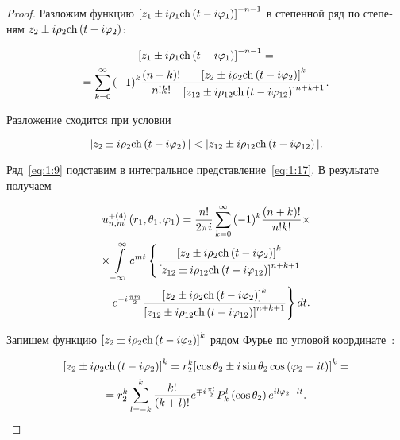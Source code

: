 \begin{russian}
\begin{proof}
Разложим функцию ${\left[ {{z_1} \pm i{\rho _1}{\mathop{\rm ch}\nolimits} \left( {t - i{\varphi _1}} \right)} \right]^{ - n - 1}}$ в степенной ряд по степеням ${z_2} \pm i{\rho _2}{\mathop{\rm ch}\nolimits} \left( {t - i{\varphi _2}} \right)$:

\begin{multline}\label{eq:1:19}
{\left[ {{z_1} \pm i{\rho _1}{\mathop{\rm ch}\nolimits} \left( {t - i{\varphi _1}} \right)} \right]^{ - n - 1}} = \\
= \sum\limits_{k = 0}^\infty  {{{( - 1)}^k}} \frac{{(n + k)!}}{{n!k!}}\frac{{{{\left[ {{z_2} \pm i{\rho _2}{\mathop{\rm ch}\nolimits} \left( {t - i{\varphi _2}} \right)} \right]}^k}}}{{{{\left[ {{z_{12}} \pm i{\rho _{12}}{\mathop{\rm ch}\nolimits} \left( {t - i{\varphi _{12}}} \right)} \right]}^{n + k + 1}}}}.
\end{multline}

Разложение сходится при условии

\[|{z_2} \pm i{\rho _2}{\mathop{\rm ch}\nolimits} \left( {t - i{\varphi _2}} \right)| < |{z_{12}} \pm i{\rho _{12}}{\mathop{\rm ch}\nolimits} \left( {t - i{\varphi _{12}}} \right)|.\]

Ряд~\eqref{eq:1:9} подставим в интегральное представление~\eqref{eq:1:17}. В результате получаем

\begin{multline}\label{eq:1:20}
u_{n,m}^{ + (4)}\left( {{r_1},{\theta _1},{\varphi _1}} \right) = \frac{{n!}}{{2\pi i}}\mathop \sum \limits_{k = 0}^\infty  {( - 1)^k}\frac{{(n + k)!}}{{n!k!}}\times\\
\times\int\limits_{ - \infty }^\infty  {{e^{mt}}} \left\{ {\frac{{{{\left[ {{z_2} \pm i{\rho _2}{\mathop{\rm ch}\nolimits} \left( {t - i{\varphi _2}} \right)} \right]}^k}}}{{{{\left[ {{z_{12}} \pm i{\rho _{12}}{\mathop{\rm ch}\nolimits} \left( {t - i{\varphi _{12}}} \right)} \right]}^{n + k + 1}}}} - } \right.\\
\left. { - {e^{ - i\frac{{\pi m}}{2}}}\frac{{{{\left[ {{z_2} \pm i{\rho _2}{\mathop{\rm ch}\nolimits} \left( {t - i{\varphi _2}} \right)} \right]}^k}}}{{{{\left[ {{z_{12}} \pm i{\rho _{12}}{\mathop{\rm ch}\nolimits} \left( {t - i{\varphi _{12}}} \right)} \right]}^{n + k + 1}}}}} \right\}dt.
\end{multline}

Запишем функцию ${\left[ {{z_2} \pm i{\rho _2}{\mathop{\rm ch}\nolimits} \left( {t - i{\varphi _2}} \right)} \right]^k}$ рядом Фурье по угловой координате~\cite{Lebedev}:

\begin{multline}\label{eq:1:21}
{\left[ {{z_2} \pm i{\rho _2}{\mathop{\rm ch}\nolimits} \left( {t - i{\varphi _2}} \right)} \right]^k} = r_2^k{\left[ {\cos {\theta _2} \pm i\sin {\theta _2}\cos \left( {{\varphi _2} + it} \right)} \right]^k} = \\
= r_2^k\sum\limits_{l =  - k}^k {\frac{{k!}}{{(k + l)!}}} {e^{ \mp i\frac{{\pi l}}{2}}}P_k^l\left( {\cos {\theta _2}} \right){e^{il{\varphi _2} - lt}}.
\end{multline}


\end{proof}
\end{russian}
